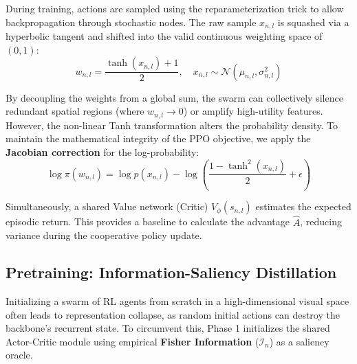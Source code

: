 During training, actions are sampled using the reparameterization trick to allow backpropagation through stochastic nodes. The raw sample $x_{n,l}$ is squashed via a hyperbolic tangent and shifted into the valid continuous weighting space of $(0, 1)$:
\begin{equation}
	w_{n,l} = \frac{\tanh(x_{n,l}) + 1}{2}, \quad x_{n,l} \sim \mathcal{N}(\mu_{n,l}, \sigma_{n,l}^2)
\end{equation}

By decoupling the weights from a global sum, the swarm can collectively silence redundant spatial regions (where $w_{n,l} \to 0$) or amplify high-utility features. However, the non-linear Tanh transformation alters the probability density. To maintain the mathematical integrity of the PPO objective, we apply the \textbf{Jacobian correction} for the log-probability:
\begin{equation}
	\log \pi(w_{n,l}) = \log p(x_{n,l}) - \log \left( \frac{1 - \tanh^2(x_{n,l})}{2} + \epsilon \right)
\end{equation}

Simultaneously, a shared Value network (Critic) $V_\phi(s_{n,l})$ estimates the expected episodic return. This provides a baseline to calculate the advantage $\hat{A}$, reducing variance during the cooperative policy update.

\subsection{Pretraining: Information-Saliency Distillation}
Initializing a swarm of RL agents from scratch in a high-dimensional visual space often leads to representation collapse, as random initial actions can destroy the backbone's recurrent state. To circumvent this, Phase 1 initializes the shared Actor-Critic module using empirical \textbf{Fisher Information} ($\mathcal{I}_n$) as a saliency oracle.

